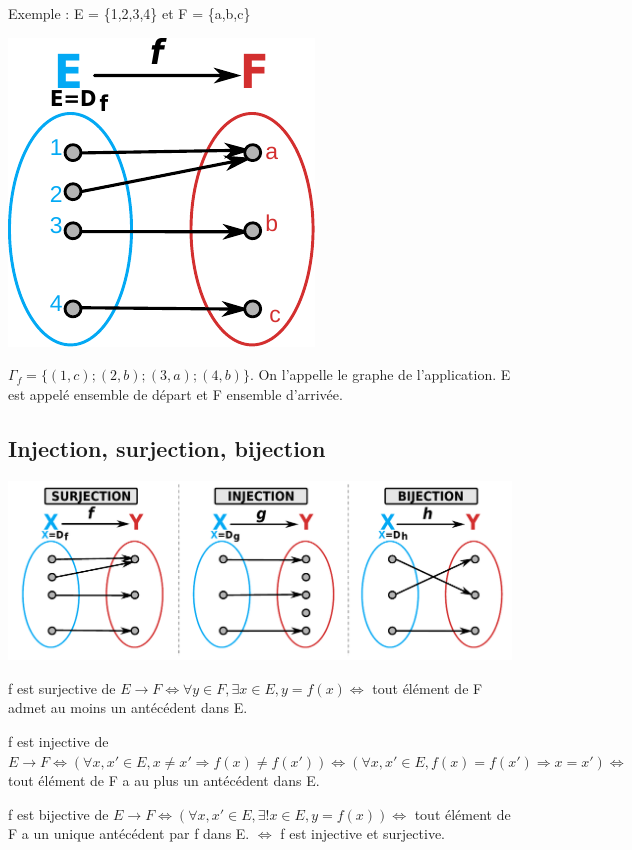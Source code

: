 \documentclass[french]{yLectureNote}
\begin{document}
Exemple : E = \{1,2,3,4\} et F = \{a,b,c\}

\includegraphics[scale=0.8]{app-def}

$\Gamma_f = \{(1,c);(2,b);(3,a);(4,b)\}$. On l'appelle le graphe de l'application. E est appelé ensemble de départ et F ensemble d'arrivée.

\subsection{Injection, surjection, bijection}
\includegraphics[scale=0.6]{application}

\begin{theorem}[Surjectivité]
f est surjective de $E \rightarrow F \iff \forall y\in F, \exists x\in E, y = f(x) \iff$ tout élément de F admet au moins un antécédent dans E.
\end{theorem}
\begin{theorem}[Injectivité]
f est injective de $E \rightarrow F \iff (\forall x, x' \in E, x\neq x' \Rightarrow f(x)\neq f(x')) \iff (\forall x, x' \in E, f(x) = f(x') \Rightarrow x = x') \iff$ tout élément de F a au plus un antécédent dans E.
\end{theorem}
\begin{theorem}[Bijectivité]
f est bijective de $E \rightarrow F \iff (\forall x, x' \in E, \exists!x\in E, y=f(x) )\iff$ tout élément de F a un unique antécédent par f dans E. $\iff$ f est injective et surjective.
\end{theorem}
\end{document}
